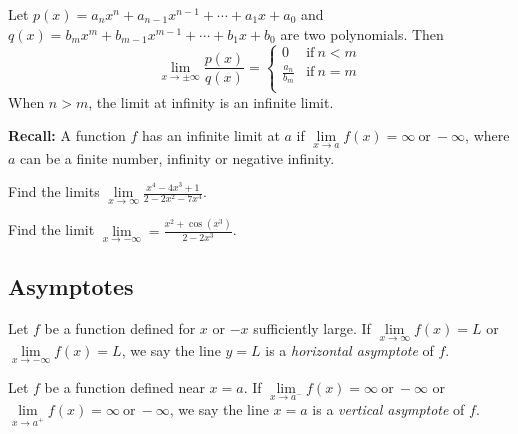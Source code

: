 \begin{theorem}

Let \(p(x)=a_nx^n+a_{n-1}x^{n-1}+\cdots + a_{1}x+a_0\) and
\(q(x)=b_m x^m+b_{m-1}x^{m-1}+\cdots + b_1x+b_0\) are two polynomials.
Then \[
\lim\limits_{x\to \pm\infty}\frac{p(x)}{q(x)}=
\begin{cases}
0 & \text{if}~ n<m\\
\frac{a_n}{b_m} & \text{if}~ n=m\\
\end{cases}
\] When \(n>m\), the limit at infinity is an infinite limit.

\end{theorem}

\textbf{Recall:} A function \(f\) has an infinite limit at \(a\) if
\(\lim\limits_{x\to a}f(x)=\infty ~\text{or}~-\infty\), where \(a\) can
be a finite number, infinity or negative infinity.

\begin{example}

Find the limits
\(\lim\limits_{x\to \infty} \frac{x^4 - 4x^3+1}{2 - 2x^2 - 7x^4}\).

\end{example}
\vspace*{6\baselineskip}

\begin{example}

Find the limit
\(\lim\limits_{x\to -\infty} =\frac{x^2+\cos(x^3)}{2 - 2x^3}\).

\end{example}
\vspace*{6\baselineskip}

\hypertarget{asymptotes}{%
\subsection{Asymptotes}\label{asymptotes}}

\begin{definition}

Let \(f\) be a function defined for \(x\) or \(-x\) sufficiently large.
If \(\lim\limits_{x\to \infty}f(x)=L\) or
\(\lim\limits_{x\to -\infty}f(x)=L\), we say the line \(y=L\) is a
\emph{horizontal asymptote} of \(f\).

Let \(f\) be a function defined near \(x=a\). If
\(\lim\limits_{x\to a^-}f(x)=\infty~\text{or}~-\infty\) or
\(\lim\limits_{x\to a^+}f(x)=\infty ~\text{or}~-\infty\), we say the
line \(x=a\) is a \emph{vertical asymptote} of \(f\).

\end{definition}

